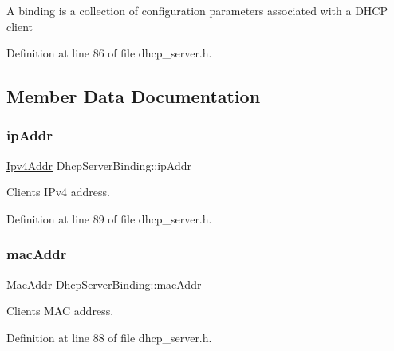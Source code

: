 A binding is a collection of configuration parameters associated with a D\+H\+CP client 

Definition at line 86 of file dhcp\+\_\+server.\+h.



\subsection{Member Data Documentation}
\mbox{\label{structDhcpServerBinding_a1e389f0baa8490f1bbbcd2c1a83c7ad5}} 
\subsubsection{\texorpdfstring{ip\+Addr}{ipAddr}}
{\footnotesize\ttfamily \hyperlink{ipv4_8h_a411debb3d770caa0c06d3f73367da37f}{Ipv4\+Addr} Dhcp\+Server\+Binding\+::ip\+Addr}



Client\textquotesingle{}s I\+Pv4 address. 



Definition at line 89 of file dhcp\+\_\+server.\+h.

\mbox{\label{structDhcpServerBinding_a1bc8376a7a0ac99fd159f3f2650671b4}} 
\subsubsection{\texorpdfstring{mac\+Addr}{macAddr}}
{\footnotesize\ttfamily \hyperlink{ethernet_8h_a1e00ed3977e8a770e8b4ae4cb306d1c0}{Mac\+Addr} Dhcp\+Server\+Binding\+::mac\+Addr}



Client\textquotesingle{}s M\+AC address. 



Definition at line 88 of file dhcp\+\_\+server.\+h.

\mbox{\label{structDhcpServerBinding_ad0aee5bda4907f14bc7ca6c20cadfb09}} 
